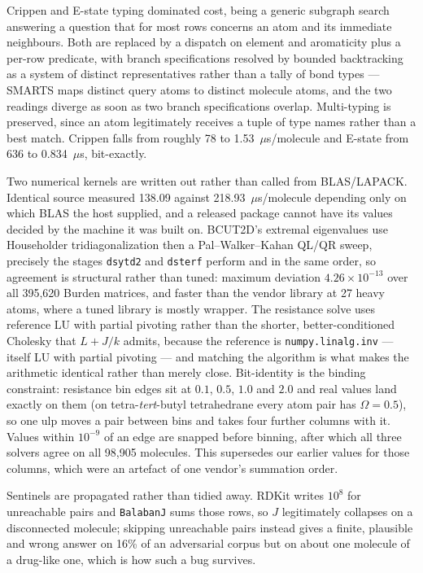 Crippen and E-state typing dominated cost, being a generic subgraph search answering a question
that for most rows concerns an atom and its immediate neighbours. Both are replaced by a
dispatch on element and aromaticity plus a per-row predicate, with branch specifications
resolved by bounded backtracking as a system of distinct representatives rather than a tally of
bond types --- SMARTS maps distinct query atoms to distinct molecule atoms, and the two readings
diverge as soon as two branch specifications overlap. Multi-typing is preserved, since an atom
legitimately receives a tuple of type names rather than a best match. Crippen falls from roughly
78 to 1.53~$\mu$s/molecule and E-state from 636 to 0.834~$\mu$s, bit-exactly.

Two numerical kernels are written out rather than called from BLAS/LAPACK. Identical source
measured 138.09 against 218.93~$\mu$s/molecule depending only on which BLAS the host supplied,
and a released package cannot have its values decided by the machine it was built on. BCUT2D's
extremal eigenvalues use Householder tridiagonalization then a Pal--Walker--Kahan QL/QR sweep,
precisely the stages \texttt{dsytd2} and \texttt{dsterf} perform and in the same order, so
agreement is structural rather than tuned: maximum deviation $4.26 \times 10^{-13}$ over all
395{,}620 Burden matrices, and faster than the vendor library at 27 heavy atoms, where a tuned
library is mostly wrapper. The resistance solve uses reference LU with partial pivoting rather
than the shorter, better-conditioned Cholesky that $L + J/k$ admits, because the reference is
\texttt{numpy.linalg.inv} --- itself LU with partial pivoting --- and matching the algorithm is
what makes the arithmetic identical rather than merely close. Bit-identity is the binding
constraint: resistance bin edges sit at $0.1$, $0.5$, $1.0$ and $2.0$ and real values land
exactly on them (on tetra-\emph{tert}-butyl tetrahedrane every atom pair has $\Omega = 0.5$), so
one ulp moves a pair between bins and takes four further columns with it. Values within
$10^{-9}$ of an edge are snapped before binning, after which all three solvers agree on all
98{,}905 molecules. This supersedes our earlier values for those columns, which were an artefact
of one vendor's summation order.

Sentinels are propagated rather than tidied away. RDKit writes $10^8$ for unreachable pairs and
\texttt{BalabanJ} sums those rows, so $J$ legitimately collapses on a disconnected molecule;
skipping unreachable pairs instead gives a finite, plausible and wrong answer on 16\% of an
adversarial corpus but on about one molecule of a drug-like one, which is how such a bug
survives.

